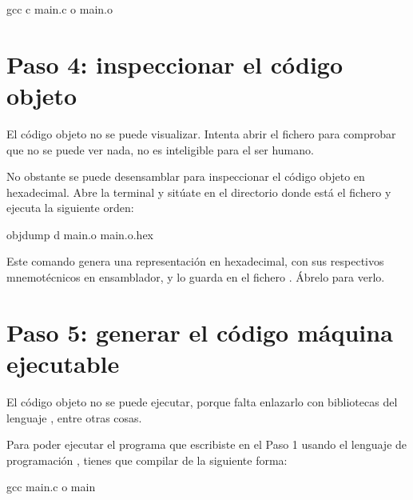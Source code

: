 \documentclass[letterpaper,10pt,spanish]{sphinxmanual}
\begin{document}
\begin{sphinxVerbatim}[commandchars=\\\{\}]
 gcc \PYGZhy{}c main.c \PYGZhy{}o main.o
\end{sphinxVerbatim}


\section{Paso 4: inspeccionar el código objeto}
\label{\detokenize{lab1:paso-4-inspeccionar-el-codigo-objeto}}
\sphinxAtStartPar
El código objeto no se puede visualizar. Intenta abrir el fichero  para comprobar que no se puede ver nada, no es inteligible para el ser humano.

\sphinxAtStartPar
No obstante se puede desensamblar para inspeccionar el código objeto en hexadecimal. Abre la terminal y sitúate en el directorio donde está el fichero  y ejecuta la siguiente orden:

\begin{sphinxVerbatim}[commandchars=\\\{\}]
 objdump \PYGZhy{}d main.o \PYGZgt{} main.o.hex
\end{sphinxVerbatim}

\sphinxAtStartPar
Este comando genera una representación en hexadecimal, con sus respectivos mnemotécnicos en ensamblador, y lo guarda en el fichero . Ábrelo para verlo.


\section{Paso 5: generar el código máquina ejecutable}
\label{\detokenize{lab1:paso-5-generar-el-codigo-maquina-ejecutable}}
\sphinxAtStartPar
El código objeto  no se puede ejecutar, porque falta enlazarlo con bibliotecas del lenguaje , entre otras cosas.

\sphinxAtStartPar
Para poder ejecutar el programa que escribiste en el Paso 1 usando el lenguaje de programación , tienes que compilar de la siguiente forma:

\begin{sphinxVerbatim}[commandchars=\\\{\}]
 gcc main.c \PYGZhy{}o main
\end{sphinxVerbatim}
\end{document}
